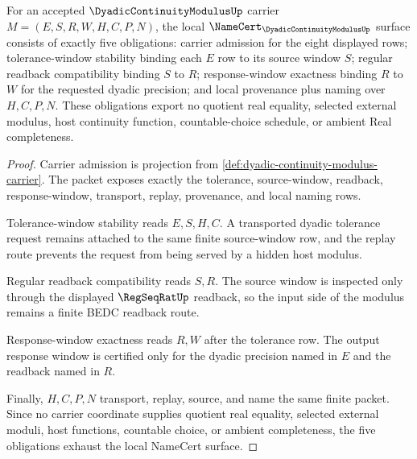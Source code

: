 \begin{theorem}
\label{thm:dyadic-continuity-modulus-namecert-obligations}
For an accepted $\DyadicContinuityModulusUp$ carrier $M=(E,S,R,W,H,C,P,N)$, the local $\NameCert_{\DyadicContinuityModulusUp}$ surface consists of exactly five obligations: carrier admission for the eight displayed rows; tolerance-window stability binding each $E$ row to its source window $S$; regular readback compatibility binding $S$ to $R$; response-window exactness binding $R$ to $W$ for the requested dyadic precision; and local provenance plus naming over $H,C,P,N$. These obligations export no quotient real equality, selected external modulus, host continuity function, countable-choice schedule, or ambient Real completeness.
\end{theorem}
\begin{proof}
Carrier admission is projection from \autoref{def:dyadic-continuity-modulus-carrier}. The packet exposes exactly the tolerance, source-window, readback, response-window, transport, replay, provenance, and local naming rows.

Tolerance-window stability reads $E,S,H,C$. A transported dyadic tolerance request remains attached to the same finite source-window row, and the replay route prevents the request from being served by a hidden host modulus.

Regular readback compatibility reads $S,R$. The source window is inspected only through the displayed $\RegSeqRatUp$ readback, so the input side of the modulus remains a finite BEDC readback route.

Response-window exactness reads $R,W$ after the tolerance row. The output response window is certified only for the dyadic precision named in $E$ and the readback named in $R$.

Finally, $H,C,P,N$ transport, replay, source, and name the same finite packet. Since no carrier coordinate supplies quotient real equality, selected external moduli, host functions, countable choice, or ambient completeness, the five obligations exhaust the local NameCert surface.
\end{proof}

